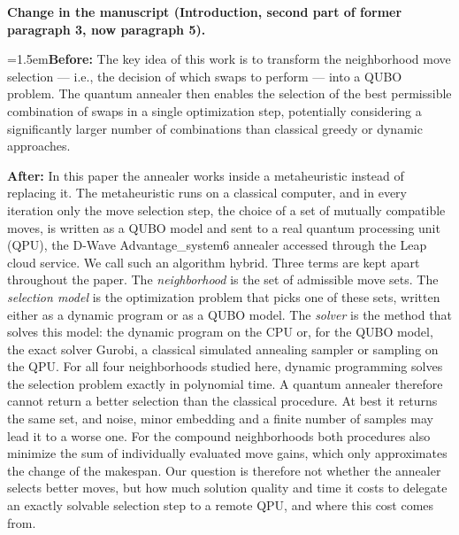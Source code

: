 \documentclass[12pt]{article}
\newcommand{\change}[3]{\par\smallskip\noindent\textbf{Change in the manuscript (#1).}\par
  {\leftskip=1.5em\noindent\textbf{Before:} #2\par\noindent\textbf{After:} #3\par}}
\begin{document}
\change{Introduction, second part of former paragraph 3, now paragraph 5}{The key idea of this work is to transform the neighborhood move selection — i.e., the decision of which swaps to perform — into a QUBO problem. The quantum annealer then enables the selection of the best permissible combination of swaps in a single optimization step, potentially considering a significantly larger number of combinations than classical greedy or dynamic approaches.}{In this paper the annealer works inside a metaheuristic instead of replacing it. The metaheuristic runs on a classical computer, and in every iteration only the move selection step, the choice of a set of mutually compatible moves, is written as a QUBO model and sent to a real quantum processing unit (QPU), the D-Wave Advantage\_system6 annealer accessed through the Leap cloud service. We call such an algorithm hybrid. Three terms are kept apart throughout the paper. The \emph{neighborhood} is the set of admissible move sets. The \emph{selection model} is the optimization problem that picks one of these sets, written either as a dynamic program or as a QUBO model. The \emph{solver} is the method that solves this model: the dynamic program on the CPU or, for the QUBO model, the exact solver Gurobi, a classical simulated annealing sampler or sampling on the QPU. For all four neighborhoods studied here, dynamic programming solves the selection problem exactly in polynomial time. A quantum annealer therefore cannot return a better selection than the classical procedure. At best it returns the same set, and noise, minor embedding and a finite number of samples may lead it to a worse one. For the compound neighborhoods both procedures also minimize the sum of individually evaluated move gains, which only approximates the change of the makespan. Our question is therefore not whether the annealer selects better moves, but how much solution quality and time it costs to delegate an exactly solvable selection step to a remote QPU, and where this cost comes from.}
\end{document}
